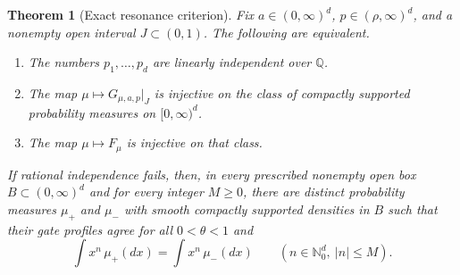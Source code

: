 \documentclass[11pt,letterpaper]{article}
\newtheorem{theorem}{Theorem}[section]
\theoremstyle{definition}
\theoremstyle{remark}
\newcommand{\1}{\mathbf 1}
\begin{document}
\begin{theorem}[Exact resonance criterion]\label{p07:thm:resonance-criterion}
Fix $a\in(0,\infty)^d$, $p\in(\rho,\infty)^d$, and a nonempty open
interval $J\subset(0,1)$.  The following are equivalent.
\begin{enumerate}
\item The numbers $p_1,\ldots,p_d$ are linearly independent over
$\mathbb Q$.
\item The map $\mu\mapsto G_{\mu,a,p}|_J$ is injective on the class of
compactly supported probability measures on $[0,\infty)^d$.
\item The map $\mu\mapsto F_\mu$ is injective on that class.
\end{enumerate}
If rational independence fails, then, in every prescribed nonempty open
box $B\subset(0,\infty)^d$ and for every integer $M\geq0$, there are
distinct probability measures $\mu_+$ and $\mu_-$ with smooth compactly
supported densities in $B$ such that their gate profiles agree for all
$0<\theta<1$ and
\begin{equation}\label{p07:eq:res-moments}
 \int x^n\,\mu_+(dx)=\int x^n\,\mu_-(dx)
 \qquad (n\in\mathbb N_0^d,\ |n|\leq M).
\end{equation}
\end{theorem}
\end{document}
